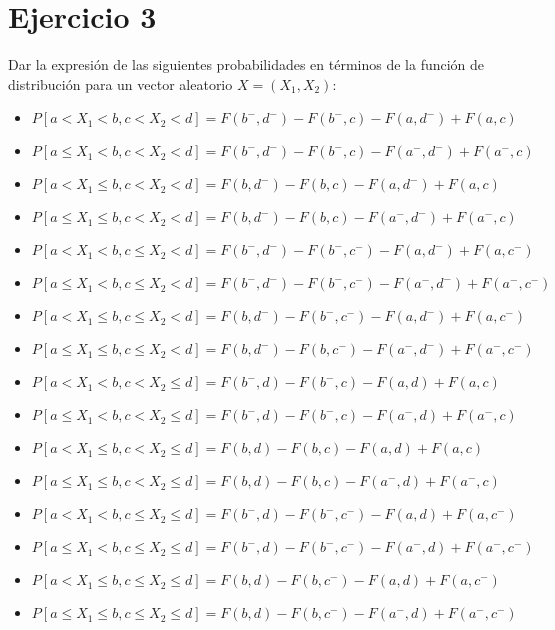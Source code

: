 \documentclass{article}
\begin{document}
\section*{Ejercicio 3}

Dar la expresión de las siguientes probabilidades en términos de la
función de distribución para un vector aleatorio $X = (X_1 , X_2)$:
\begin{itemize}
\item $P[a < X_1 < b, c < X_2 < d] = F(b^-,d^-) - F(b^-,c) - F(a,d^-) + F(a,c)$
\item $P[a \leq X_1 < b, c < X_2 < d] = F(b^-,d^-) - F(b^-,c) - F(a^-,d^-) + F(a^-,c)$
\item $P[a < X_1 \leq b, c < X_2 < d] = F(b,d^-) - F(b,c) - F(a,d^-) + F(a,c)$
\item $P[a \leq X_1 \leq b, c < X_2 < d] = F(b,d^-) - F(b,c) - F(a^-,d^-) + F(a^-,c)$
\item $P[a < X_1 < b, c \leq X_2 < d] = F(b^-,d^-) - F(b^-,c^-) - F(a,d^-) + F(a,c^-)$
\item $P[a \leq X_1 < b, c \leq X_2 < d] = F(b^-,d^-) - F(b^-,c^-) - F(a^-,d^-) + F(a^-,c^-)$
\item $P[a < X_1 \leq b, c \leq X_2 < d] = F(b,d^-) - F(b^-,c^-) - F(a,d^-) + F(a,c^-)$
\item $P[a \leq X_1 \leq b, c \leq X_2 < d] = F(b,d^-) - F(b,c^-) - F(a^-,d^-) + F(a^-,c^-)$
\item $P[a < X_1 < b, c < X_2 \leq d] = F(b^-,d) - F(b^-,c) - F(a,d) + F(a,c)$
\item $P[a \leq X_1 < b, c < X_2 \leq d] = F(b^-,d) - F(b^-,c) - F(a^-,d) + F(a^-,c)$
\item $P[a < X_1 \leq b, c < X_2 \leq d] = F(b,d) - F(b,c) - F(a,d) + F(a,c)$
\item $P[a \leq X_1 \leq b, c < X_2 \leq d] = F(b,d) - F(b,c) - F(a^-,d) + F(a^-,c)$
\item $P[a < X_1 < b, c \leq X_2 \leq d] = F(b^-,d) - F(b^-,c^-) - F(a,d) + F(a,c^-)$
\item $P[a \leq X_1 < b, c \leq X_2 \leq d] = F(b^-,d) - F(b^-,c^-) - F(a^-,d) + F(a^-,c^-)$
\item $P[a < X_1 \leq b, c \leq X_2 \leq d] = F(b,d) - F(b,c^-) - F(a,d) + F(a,c^-)$
\item $P[a \leq X_1 \leq b, c \leq X_2 \leq d] = F(b,d) - F(b,c^-) - F(a^-,d) + F(a^-,c^-)$
\end{itemize}
\end{document}
